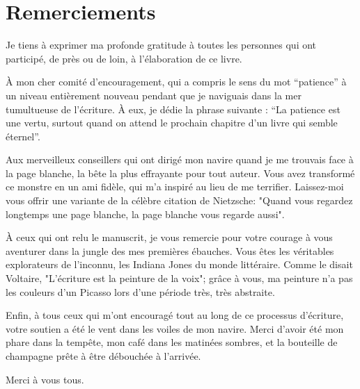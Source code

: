 \part*{Remerciements}

Je tiens à exprimer ma profonde gratitude à toutes les personnes qui ont participé, de près ou de loin, à l'élaboration de ce livre. 

À mon cher comité d'encouragement, qui a compris le sens du mot ``patience'' à un niveau entièrement nouveau pendant que je naviguais dans la mer tumultueuse de l'écriture. À eux, je dédie la phrase suivante : ``La patience est une vertu, surtout quand on attend le prochain chapitre d'un livre qui semble éternel''. 

Aux merveilleux conseillers qui ont dirigé mon navire quand je me trouvais face à la page blanche, la bête la plus effrayante pour tout auteur. Vous avez transformé ce monstre en un ami fidèle, qui m'a inspiré au lieu de me terrifier. Laissez-moi vous offrir une variante de la célèbre citation de Nietzsche: "Quand vous regardez longtemps une page blanche, la page blanche vous regarde aussi".

À ceux qui ont relu le manuscrit, je vous remercie pour votre courage à vous aventurer dans la jungle des mes premières ébauches. Vous êtes les véritables explorateurs de l'inconnu, les Indiana Jones du monde littéraire. Comme le disait Voltaire, "L'écriture est la peinture de la voix"; grâce à vous, ma peinture n'a pas les couleurs d'un Picasso lors d'une période très, très abstraite. 

Enfin, à tous ceux qui m'ont encouragé tout au long de ce processus d'écriture, votre soutien a été le vent dans les voiles de mon navire. Merci d'avoir été mon phare dans la tempête, mon café dans les matinées sombres, et la bouteille de champagne prête à être débouchée à l'arrivée.

Merci à vous tous.